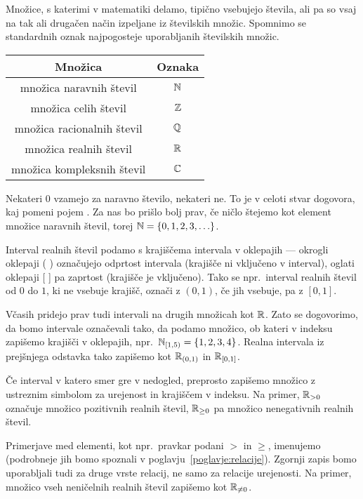 Množice, s katerimi v matematiki delamo, tipično vsebujejo števila, ali pa so vsaj na tak ali drugačen način izpeljane iz številskih množic. Spomnimo se standardnih oznak najpogosteje uporabljanih številskih množic.
\begin{center}
\begin{tabular}{|cc|}
\hline
\textbf{Množica} & \textbf{Oznaka} \\
\hline
množica naravnih števil & $\mathbb{N}$ \\
množica celih števil & $\mathbb{Z}$ \\
množica racionalnih števil & $\mathbb{Q}$ \\
množica realnih števil & $\mathbb{R}$ \\
množica kompleksnih števil & $\mathbb{C}$ \\
\hline
\end{tabular}
\end{center}

Nekateri $0$ vzamejo za naravno število, nekateri ne. To je v celoti stvar dogovora, kaj pomeni pojem . Za nas bo prišlo bolj prav, če ničlo štejemo kot element množice naravnih števil, torej $\NN = \set{0, 1, 2, 3, \ldots}$.

Interval realnih števil podamo s krajiščema intervala v oklepajih --- okrogli oklepaji ( ) označujejo odprtost intervala (krajišče ni vključeno v interval), oglati oklepaji [ ] pa zaprtost (krajišče je vključeno). Tako se npr.~interval realnih števil od $0$ do $1$, ki ne vsebuje krajišč, označi z $(0, 1)$, če jih vsebuje, pa z $[0, 1]$.

Včasih pridejo prav tudi intervali na drugih množicah kot $\mathbb{R}$. Zato se dogovorimo, da bomo intervale označevali tako, da podamo množico, ob kateri v indeksu zapišemo krajišči v oklepajih, npr.~$\intco[\NN]{1}{5} = \set{1, 2, 3, 4}$. Realna intervala iz prejšnjega odstavka tako zapišemo kot ${\mathbb{R}}_{(0, 1)}$ in ${\mathbb{R}}_{[0, 1]}$.

Če interval v katero smer gre v nedogled, preprosto zapišemo množico z ustreznim simbolom za urejenost in krajiščem v indeksu. Na primer, $\mathbb{R}_{> 0}$ označuje množico pozitivnih realnih števil, $\mathbb{R}_{\geq 0}$ pa množico nenegativnih realnih števil.

Primerjave med elementi, kot npr.~pravkar podani $>$ in $\geq$, imenujemo  (podrobneje jih bomo spoznali v poglavju~\ref{poglavje:relacije}). Zgornji zapis bomo uporabljali tudi za druge vrste relacij, ne samo za relacije urejenosti. Na primer, množico vseh neničelnih realnih števil zapišemo kot $\mathbb{R}_{\neq 0}$.

